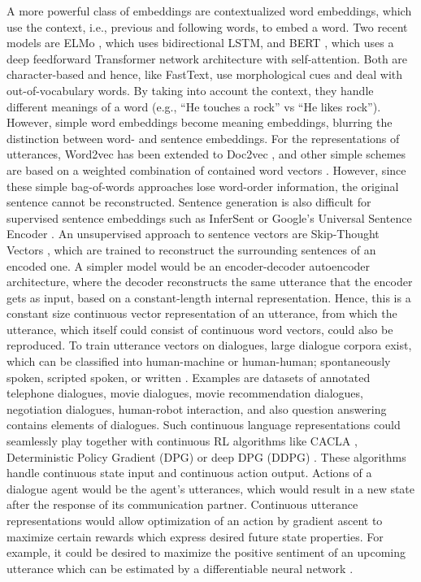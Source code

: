 \begin{enumerate}
A more powerful class of embeddings are contextualized word  embeddings, which use the context, i.e., previous and following words,  to embed a word. Two recent models are ELMo , which uses bidirectional LSTM, and BERT , which uses a deep  feedforward Transformer network architecture with self-attention. Both  are character-based and hence, like FastText, use morphological cues  and deal with out-of-vocabulary words. By taking into account the context, they handle different meanings of a word (e.g., 
``He touches a  rock'' vs ``He likes rock''). However, simple word embeddings become  meaning embeddings, blurring the distinction between word- and  sentence embeddings.
For the representations of utterances, Word2vec has been extended to  Doc2vec , and other simple schemes are based on a  weighted combination of contained word vectors  . However, since these simple  bag-of-words approaches lose word-order information, the original sentence cannot be reconstructed. Sentence generation is also difficult for supervised  sentence embeddings such as InferSent  or Google's  Universal Sentence Encoder .
An unsupervised approach to sentence vectors are Skip-Thought Vectors  , which are trained to reconstruct the surrounding  sentences of an encoded one. A simpler model would be an  encoder-decoder autoencoder architecture, where the decoder  reconstructs the same utterance that the encoder gets as input, based  on a constant-length internal representation. Hence, this is a  constant size continuous vector representation of an utterance, from  which the utterance, which itself could consist of continuous word  vectors, could also be reproduced.
To train utterance vectors on dialogues, large dialogue corpora exist,  which can be classified into human-machine or human-human;  spontaneously spoken, scripted spoken, or written .  Examples are datasets of annotated telephone dialogues, movie  dialogues, movie recommendation dialogues, negotiation dialogues,  human-robot interaction, and also question answering contains elements  of dialogues.
Such continuous language representations could seamlessly play  together with continuous RL algorithms like CACLA ,  Deterministic Policy Gradient (DPG)  or deep DPG  (DDPG) . These algorithms handle continuous state  input and continuous action output. Actions of a dialogue agent would  be the agent's utterances, which would result in a new state after the  response of its communication partner. Continuous utterance  representations would allow optimization of an action by gradient ascent to maximize certain rewards which express desired future state properties. For example, it could be desired to maximize the positive  sentiment of an upcoming utterance which can be estimated by a  differentiable neural network .

\end{enumerate}
